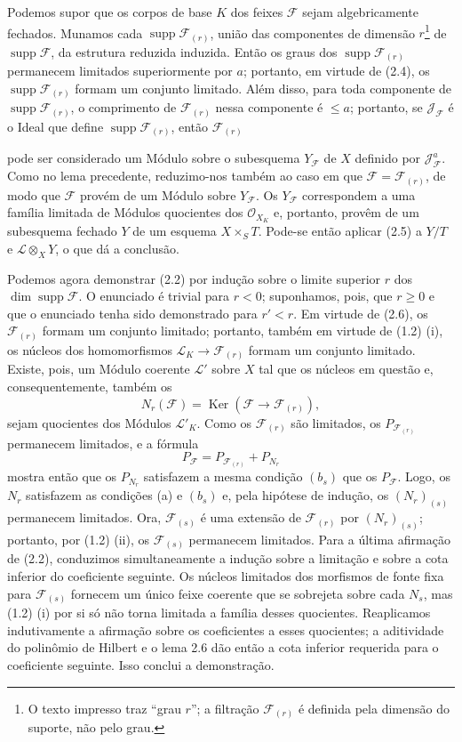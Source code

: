 \documentclass[11pt,twoside,openany]{book}
\numberwithin{equation}{section}
\newcommand{\src}[1]{%
  \phantomsection\hypertarget{src:#1}{}%
  \marginpar{\raggedleft\footnotesize\sffamily #1}%
}
\theoremstyle{plain}
\theoremstyle{definition}
\theoremstyle{remark}
\newcommand{\FgaUnitKey}{frontmatter}
\renewcommand{\src}[1]{%
  \phantomsection\hypertarget{src:\FgaUnitKey:#1}{}%
  \marginpar{\raggedleft\footnotesize\sffamily #1}%
}
\begin{document}
Podemos supor que os corpos de base $K$ dos feixes $\mathcal F$ sejam
algebricamente fechados. Munamos cada
$\operatorname{supp}\mathcal F_{(r)}$, união das componentes de dimensão
$r$\footnote{O texto impresso traz “grau $r$”; a filtração
$\mathcal F_{(r)}$ é definida pela dimensão do suporte, não pelo grau.} de
$\operatorname{supp}\mathcal F$, da estrutura reduzida induzida. Então os graus dos
$\operatorname{supp}\mathcal F_{(r)}$ permanecem limitados superiormente por
$a$; portanto, em virtude de (2.4), os
$\operatorname{supp}\mathcal F_{(r)}$ formam um conjunto limitado. Além disso,
para toda componente de $\operatorname{supp}\mathcal F_{(r)}$, o comprimento de
$\mathcal F_{(r)}$ nessa componente é $\leq a$; portanto, se
$\mathcal J_{\mathcal F}$ é o Ideal que define
$\operatorname{supp}\mathcal F_{(r)}$, então $\mathcal F_{(r)}$
\src{258}
pode ser considerado um Módulo sobre o subesquema $Y_{\mathcal F}$ de $X$
definido por $\mathcal J_{\mathcal F}^{a}$. Como no lema precedente, reduzimo-nos também
ao caso em que $\mathcal F=\mathcal F_{(r)}$, de modo que $\mathcal F$
provém de um Módulo sobre $Y_{\mathcal F}$. Os $Y_{\mathcal F}$ correspondem
a uma família limitada de Módulos quocientes dos $\mathcal O_{X_K}$ e,
portanto, provêm de um subesquema fechado $Y$ de um esquema $X\times_S T$.
Pode-se então aplicar (2.5) a $Y/T$ e $\mathcal L\otimes_XY$, o que dá a
conclusão.

Podemos agora demonstrar (2.2) por indução sobre o limite superior $r$ dos
$\dim\operatorname{supp}\mathcal F$. O enunciado é trivial para $r<0$;
suponhamos, pois, que $r\geq0$ e que o enunciado tenha sido demonstrado para
$r'<r$. Em virtude de (2.6), os $\mathcal F_{(r)}$ formam um conjunto
limitado; portanto, também em virtude de (1.2) (i), os núcleos dos
homomorfismos $\mathcal L_K\longrightarrow\mathcal F_{(r)}$ formam um
conjunto limitado. Existe, pois, um Módulo coerente $\mathcal L'$ sobre $X$
tal que os núcleos em questão e, consequentemente, também os
\[
N_r(\mathcal F)=\operatorname{Ker}(\mathcal F\longrightarrow\mathcal F_{(r)}),
\]
sejam quocientes dos Módulos $\mathcal L'_K$. Como os $\mathcal F_{(r)}$ são
limitados, os $P_{\mathcal F_{(r)}}$ permanecem limitados, e a fórmula
\[
P_{\mathcal F}=P_{\mathcal F_{(r)}}+P_{N_r}
\]
mostra então que os $P_{N_r}$ satisfazem a mesma condição $(b_s)$ que os
$P_{\mathcal F}$. Logo, os $N_r$ satisfazem as condições (a) e $(b_s)$ e,
pela hipótese de indução, os $(N_r)_{(s)}$ permanecem limitados. Ora,
$\mathcal F_{(s)}$ é uma extensão de $\mathcal F_{(r)}$ por
$(N_r)_{(s)}$; portanto, por (1.2) (ii), os $\mathcal F_{(s)}$ permanecem
limitados. Para a última afirmação de (2.2), conduzimos simultaneamente a indução sobre a limitação e sobre a cota inferior do coeficiente seguinte. Os núcleos limitados dos morfismos de fonte fixa para $\mathcal F_{(s)}$ fornecem um único feixe coerente que se sobrejeta sobre cada $N_s$, mas (1.2) (i) por si só não torna limitada a família desses quocientes. Reaplicamos indutivamente a afirmação sobre os coeficientes a esses quocientes; a aditividade do polinômio de Hilbert e o lema 2.6 dão então a cota inferior requerida para o coeficiente seguinte. Isso conclui a demonstração.
\end{document}
